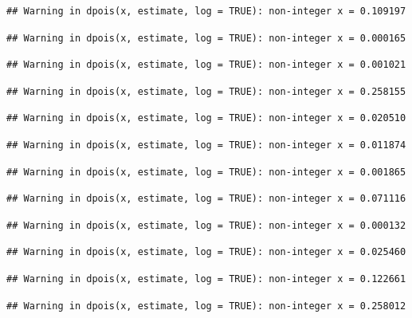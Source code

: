 \documentclass[]{article}
\begin{document}
\begin{verbatim}
## Warning in dpois(x, estimate, log = TRUE): non-integer x = 0.109197
\end{verbatim}

\begin{verbatim}
## Warning in dpois(x, estimate, log = TRUE): non-integer x = 0.000165
\end{verbatim}

\begin{verbatim}
## Warning in dpois(x, estimate, log = TRUE): non-integer x = 0.001021
\end{verbatim}

\begin{verbatim}
## Warning in dpois(x, estimate, log = TRUE): non-integer x = 0.258155
\end{verbatim}

\begin{verbatim}
## Warning in dpois(x, estimate, log = TRUE): non-integer x = 0.020510
\end{verbatim}

\begin{verbatim}
## Warning in dpois(x, estimate, log = TRUE): non-integer x = 0.011874
\end{verbatim}

\begin{verbatim}
## Warning in dpois(x, estimate, log = TRUE): non-integer x = 0.001865
\end{verbatim}

\begin{verbatim}
## Warning in dpois(x, estimate, log = TRUE): non-integer x = 0.071116
\end{verbatim}

\begin{verbatim}
## Warning in dpois(x, estimate, log = TRUE): non-integer x = 0.000132
\end{verbatim}

\begin{verbatim}
## Warning in dpois(x, estimate, log = TRUE): non-integer x = 0.025460
\end{verbatim}

\begin{verbatim}
## Warning in dpois(x, estimate, log = TRUE): non-integer x = 0.122661
\end{verbatim}

\begin{verbatim}
## Warning in dpois(x, estimate, log = TRUE): non-integer x = 0.258012
\end{verbatim}
\end{document}
